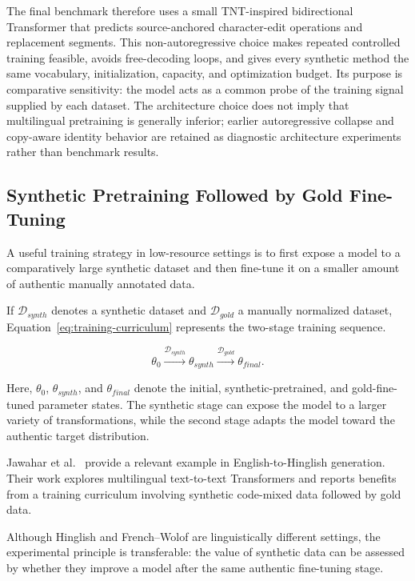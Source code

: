 \documentclass[12pt, a4paper, twoside, openany]{report}
\begin{document}
The final benchmark therefore uses a small TNT-inspired bidirectional Transformer that predicts source-anchored character-edit operations and replacement segments. This non-autoregressive choice makes repeated controlled training feasible, avoids free-decoding loops, and gives every synthetic method the same vocabulary, initialization, capacity, and optimization budget. Its purpose is comparative sensitivity: the model acts as a common probe of the training signal supplied by each dataset. The architecture choice does not imply that multilingual pretraining is generally inferior; earlier autoregressive collapse and copy-aware identity behavior are retained as diagnostic architecture experiments rather than benchmark results.


\subsection{Synthetic Pretraining Followed by Gold Fine-Tuning}

A useful training strategy in low-resource settings is to first expose a model to a comparatively large synthetic dataset and then fine-tune it on a smaller amount of authentic manually annotated data.

If $\mathcal{D}_{synth}$ denotes a synthetic dataset and $\mathcal{D}_{gold}$ a manually normalized dataset, Equation~\eqref{eq:training-curriculum} represents the two-stage training sequence.

\begin{equation}
	\theta_0
	\xrightarrow{\mathcal{D}_{synth}}
	\theta_{synth}
	\xrightarrow{\mathcal{D}_{gold}}
	\theta_{final}.
	\label{eq:training-curriculum}
\end{equation}

Here, $\theta_0$, $\theta_{synth}$, and $\theta_{final}$ denote the initial, synthetic-pretrained, and gold-fine-tuned parameter states. The synthetic stage can expose the model to a larger variety of transformations, while the second stage adapts the model toward the authentic target distribution.

Jawahar et al.~\cite{jawahar2021hinglish} provide a relevant example in English-to-Hinglish generation. Their work explores multilingual text-to-text Transformers and reports benefits from a training curriculum involving synthetic code-mixed data followed by gold data.

Although Hinglish and French--Wolof are linguistically different settings, the experimental principle is transferable: the value of synthetic data can be assessed by whether they improve a model after the same authentic fine-tuning stage.
\end{document}
